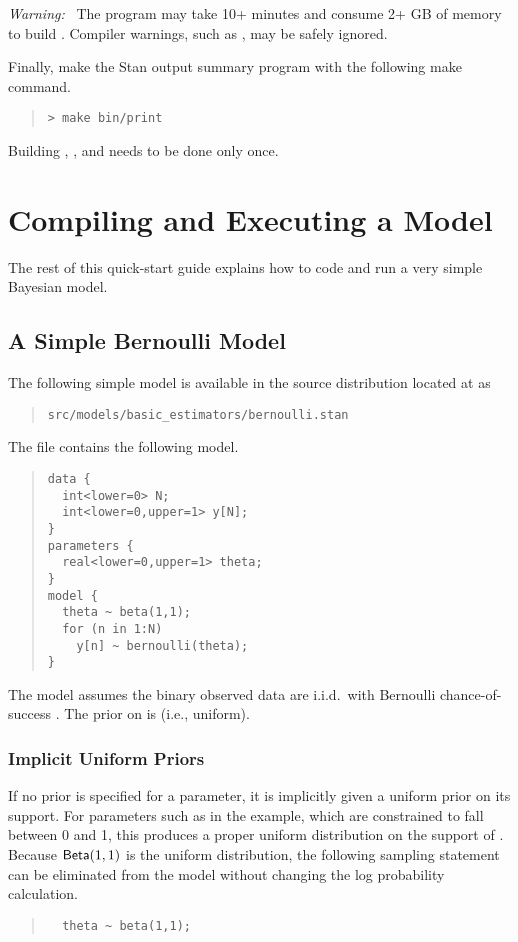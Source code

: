 \emph{Warning:} \ The  program may take 10+ minutes and
consume 2+ GB of memory to build .  Compiler warnings,
such as , may be safely ignored.
 
Finally, make the Stan output summary program with the following
make command.
%
\begin{quote}
\begin{Verbatim}[fontshape=sl]
> make bin/print
\end{Verbatim}
\end{quote}
%

Building , , and 
needs to be done only once.

\section{Compiling and Executing a Model}\label{compiling-model.section}

The rest of this quick-start guide explains how to code
and run a very simple Bayesian model.

\subsection{A Simple Bernoulli Model}

The following simple model is available in the source
distribution located at  as
%
\begin{quote}
\nolinkurl{src/models/basic_estimators/bernoulli.stan}
\end{quote}
%
The file contains the following model.
%
\begin{quote}
\begin{Verbatim}
data { 
  int<lower=0> N; 
  int<lower=0,upper=1> y[N];
} 
parameters {
  real<lower=0,upper=1> theta;
} 
model {
  theta ~ beta(1,1);
  for (n in 1:N) 
    y[n] ~ bernoulli(theta);
}
\end{Verbatim}
\end{quote}
%
The model assumes the binary observed data 
are i.i.d.\ with Bernoulli chance-of-success .  The
prior on  is  (i.e., uniform).

\subsubsection{Implicit Uniform Priors}

If no prior is specified for a parameter, it is implicitly given a
uniform prior on its support.  For parameters such as  in
the example, which are constrained to fall between 0 and 1, this
produces a proper uniform distribution on the support of .
Because $\mbox{\sf Beta}(1,1)$ is the uniform distribution, the
following sampling statement can be eliminated from the model without
changing the log probability calculation.
%
\begin{quote}
\begin{Verbatim}
  theta ~ beta(1,1);
\end{Verbatim}
\end{quote}

